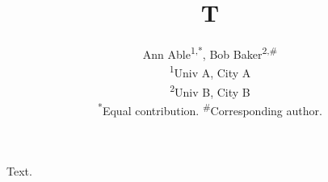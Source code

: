 \documentclass{article}
\begin{document}
\title{T}
\author{
Ann Able\textsuperscript{1,*},
Bob Baker\textsuperscript{2,\#}\\[0.5em]
\textsuperscript{1}Univ A, City A\\
\textsuperscript{2}Univ B, City B\\[0.5em]
\textsuperscript{*}Equal contribution. \textsuperscript{\#}Corresponding author.
}
\maketitle
Text.
\end{document}
